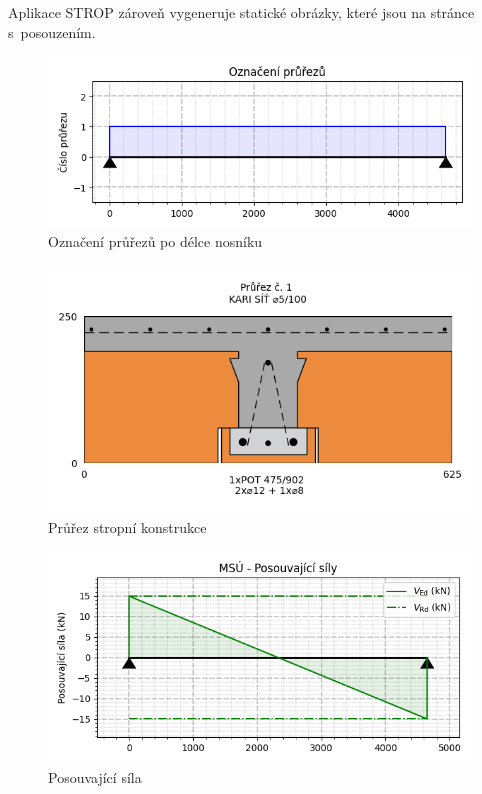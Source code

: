 Aplikace STROP zároveň vygeneruje statické obrázky, které jsou na stránce s~posouzením.
\begin{figure}[H]
    \includegraphics{assets/figures/wbapp/strop/08_prurezy.png}
    \caption{Označení průřezů po délce nosníku}
    \label{fig:wb_app_prurezy_cisla}
\end{figure}

\begin{figure}[H]
    \includegraphics{assets/figures/wbapp/strop/09_prurez.png}
    \caption{Průřez stropní konstrukce}
    \label{fig:wb_app_prurez}
\end{figure}

\begin{figure}[H]
    \includegraphics{assets/figures/wbapp/strop/10_shear.png}
    \caption{Posouvající síla}
    \label{fig:wb_app_shear}
\end{figure}

